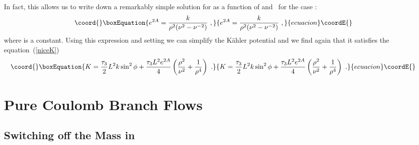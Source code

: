 \documentclass[a4paper,12pt]{article}
\providecommand{\labell}[1]{\label{#1}}
\providecommand{\reef}[1]{(\ref{#1})}
\begin{document}
In fact, this allows us to write down a remarkably simple solution for
\coordHE{} as a function of \myHighlight{$\rho$}\coordHE{} and~\myHighlight{$\nu$}\coordHE{} for the case \coordHE{}:
\begin{equation}\coord{}\boxEquation{
e^{2A} =  {k \over \rho^2 (\nu^2 - \nu^{-2})}\ ,
\labell{N1-coulomb-c}
}{
e^{2A} =  {k \over \rho^2 (\nu^2 - \nu^{-2})}\ ,
\labell{N1-coulomb-c}
}{ecuacion}\coordE{}\end{equation}
where \coordHE{} is a constant.  Using this expression and setting \coordHE{}
we can simplify the K\"ahler potential and we find again that it
satisfies the equation~\reef{niceK}
\begin{equation}\coord{}\boxEquation{
  K =  {\tau_3 \over 2} L^2 k \sin^2 \phi  + {\tau_3 L^2 e^{2A} \over 4} 
\left(\frac{\rho^2}{\nu^2} + \frac{1}{\rho^4}\right)\ .
\labell{N1-coulomb-K}
}{
  K =  {\tau_3 \over 2} L^2 k \sin^2 \phi  + {\tau_3 L^2 e^{2A} \over 4} 
\left(\frac{\rho^2}{\nu^2} + \frac{1}{\rho^4}\right)\ .
\labell{N1-coulomb-K}
}{ecuacion}\coordE{}\end{equation}

\section{Pure Coulomb Branch Flows}
\label{coulombic}

\subsection{Switching off the Mass in \coordHE{}}
\end{document}
